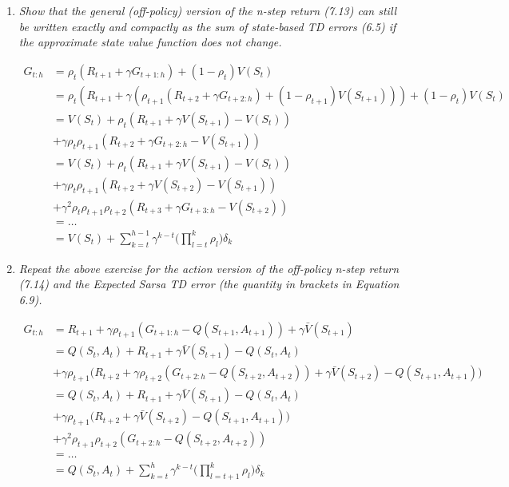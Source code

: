 \documentclass[12pt,a4paper]{article}
\begin{document}
\begin{enumerate}
  \item
    \textit{Show that the general (off-policy) version of the n-step return (7.13) can
    still be written exactly and compactly as the sum of state-based TD errors (6.5)
    if the approximate state value function does not change.}

    \begin{align*}
      G_{t: h} &= \rho_t (R_{t + 1} + \gamma G_{t + 1: h}) + (1 - \rho_t)V(S_t)\\
      &= \rho_t (R_{t + 1} + \gamma (
      \rho_{t + 1} (R_{t + 2} + \gamma G_{t + 2: h}) + (1 - \rho_{t + 1})V(S_{t + 1})
      )) + (1 - \rho_t)V(S_t)\\
      &= V(S_t) + \rho_t (R_{t + 1} + \gamma V(S_{t + 1}) - V(S_t))\\
      &+ \gamma \rho_t \rho_{t + 1} (R_{t + 2} + \gamma G_{t + 2: h} - V(S_{t + 1}))\\
      &= V(S_t) + \rho_t (R_{t + 1} + \gamma V(S_{t + 1}) - V(S_t))\\
      &+ \gamma \rho_t \rho_{t + 1} (R_{t + 2} + \gamma V(S_{t + 2}) - V(S_{t + 1}))\\
      &+ \gamma ^ 2 \rho_t \rho_{t + 1} \rho_{t + 2} (R_{t + 3} + \gamma G_{t + 3: h} - V(S_{t + 2}))\\
      &= \dots \\
      &= V(S_t) + \sum\limits_{k = t}^{h - 1} \gamma^{k - t} \Big(\prod_{l = t}^k
      \rho_l\Big) \delta_k
    \end{align*}

  \newpage
  \item
    \textit{Repeat the above exercise for the action version of the off-policy n-step
    return (7.14) and the Expected Sarsa TD error (the quantity in brackets in
    Equation 6.9).}

    \begin{align*}
      G_{t: h} &= R_{t + 1} + \gamma\rho_{t + 1} (G_{t + 1: h}
      - Q(S_{t + 1}, A_{t + 1})) + \gamma \bar{V}(S_{t + 1})\\
      &= Q(S_t, A_t) + R_{t + 1} + \gamma \bar{V}(S_{t + 1}) - Q(S_t, A_t)\\
      &+ \gamma \rho_{t + 1} \Big(R_{t + 2} + \gamma\rho_{t + 2} (G_{t + 2: h} -
      Q(S_{t + 2}, A_{t + 2})) + \gamma \bar{V}(S_{t + 2})
      - Q(S_{t + 1}, A_{t + 1})\Big)\\
      &= Q(S_t, A_t) + R_{t + 1} + \gamma \bar{V}(S_{t + 1}) - Q(S_t, A_t)\\
      &+ \gamma \rho_{t + 1} \Big(R_{t + 2} + \gamma \bar{V}(S_{t + 2})
      - Q(S_{t + 1}, A_{t + 1})\Big)\\
      &+ \gamma^2\rho_{t + 1}\rho_{t + 2}(G_{t + 2: h} - Q(S_{t + 2}, A_{t + 2}))\\
      &= \dots\\
      &= Q(S_t, A_t) + \sum\limits_{k = t}^{h} \gamma^{k - t} \Big(
      \prod\limits_{l = t + 1}^k \rho_{l}\Big) \delta_k
    \end{align*}


\end{enumerate}
\end{document}
